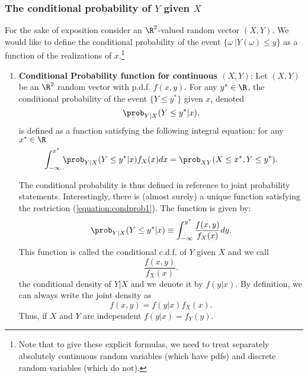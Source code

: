 \documentclass[11pt]{article} %
\begin{document}
\subsubsection{The conditional probability of $Y$ given $X$}
For the sake of exposition consider an $\R^{2}$-valued random vector $(X, Y)$. We would like to define the conditional probability of the event $\{\omega \: | Y(\omega) \leq y\}$ as a function of the realizations of $x$.\footnote{\noindent Note that to give these explicit formulas, we need to treat separately absolutely continuous random variables (which have pdfs) and discrete random variables (which do not).}\\

\begin{enumerate}
\item  \textbf{Conditional Probability function for continuous $(X, Y)$}:  Let $(X,Y)$ be an $\R^2$ random vector with p.d.f. $f(x,y)$. For any $y^* \in \R$, the conditional probability of the event $\{Y \leq y^*\}$ given $x$, denoted
$$\prob_{Y | X}(Y \leq y^* | x),$$ 
\noindent is defined as a function satisfying the following integral equation: for any $x^* \in \R$
\begin{equation} \label{equation:condprob1}
\int_{-\infty}^{x^*} \prob_{Y | X}( Y  \leq y^* | x) f_{X}(x) d x =\prob_{XY}(X \leq x^*, Y \leq y^*). \end{equation}

The conditional probability is thus defined in reference to joint probability statements. Interestingly, there is (almost surely) a unique function satisfying the restriction (\ref{equation:condprob1}). The function is given by:
\begin{equation} \label{equation:conditional_cdf}
\prob_{Y | X}(Y \leq y^* | x) \equiv \int_{-\infty}^{y^*} \frac{f(x,y)}{f_{X}(x)} dy. 
\end{equation}
\noindent This function is called the conditional c.d.f. of $Y$ given $X$ and we call
\begin{equation} \label{equation:conditional_density}
\frac{f(x,y)}{f_{X}(x)}.
\end{equation}
the conditional density of $Y | X$ and we denote it by $f(y|x)$. By definition, we can always write the joint density as
\[ f(x,y) = f(y|x) f_{X}(x). \] 
Thus, if $X$ and $Y$ are independent $f(y|x) = f_Y(y)$. 

\end{enumerate}
\end{document}
